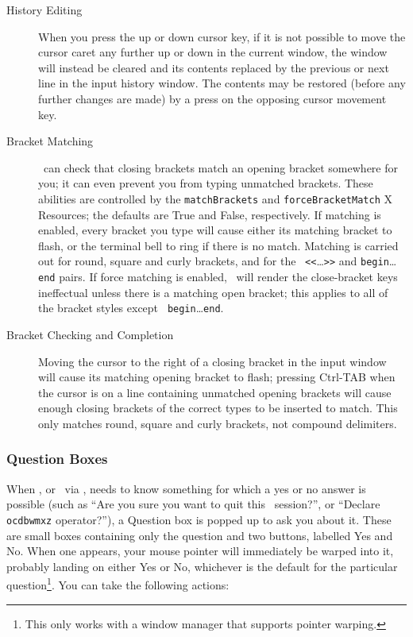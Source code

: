 \begin{description}

\item[History Editing] When you press the up or down cursor key, if it
is not possible to move the cursor caret any further up or down in the
current window, the window will instead be cleared and its contents
replaced by the previous or next line in the input history window.
The contents may be restored (before any further changes are made) by
a press on the opposing cursor movement key.

\item[Bracket Matching]\label{bracketmatching} \xr\ can check that
closing brackets match an opening bracket somewhere for you; it can
even prevent you from typing unmatched brackets.  These abilities are
controlled by the {\tt matchBrackets} and {\tt forceBracketMatch} X
Resources; the defaults are True and False, respectively.  If matching
is enabled, every bracket you type will cause either its matching
bracket to flash, or the terminal bell to ring if there is no match.
Matching is carried out for round, square and curly brackets, and for
the \REDUCE\ \verb+<<+\ldots\verb+>>+ and {\tt begin}\ldots{\tt end}
pairs.  If force matching is enabled, \xr\ will render the
close-bracket keys ineffectual unless there is a matching open
bracket; this applies to all of the bracket styles except {\tt
begin}\ldots{\tt end}.

\item[Bracket Checking and Completion] Moving the cursor to the right
of a closing bracket in the input window will cause its matching
opening bracket to flash; pressing Ctrl-TAB when the cursor is on a
line containing unmatched opening brackets will cause enough closing
brackets of the correct types to be inserted to match.  This only
matches round, square and curly brackets, not compound delimiters.
\end{description}

\subsubsection{Question Boxes}\label{questionboxes}

When \xr , or \REDUCE\ via \xr , needs to know something for which a
yes or no answer is possible (such as ``Are you sure you want to quit
this \REDUCE\ session?'', or ``Declare {\tt ocdbwmxz} operator?''), a
Question box is popped up to ask you about it.  These are small boxes
containing only the question and two buttons, labelled Yes and No.
When one appears, your mouse pointer will immediately be warped into
it, probably landing on either Yes or No, whichever is the default for
the particular question\footnote{This only works with a window manager
that supports pointer warping.}.  You can take the following actions:

